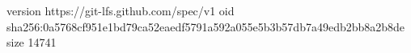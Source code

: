 version https://git-lfs.github.com/spec/v1
oid sha256:0a5768cf951e1bd79ca52eaedf5791a592a055e5b3b57db7a49edb2bb8a2b8de
size 14741
